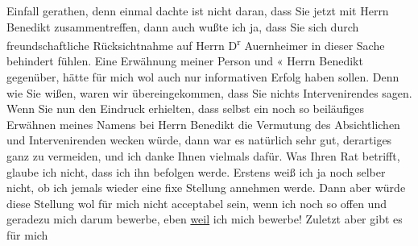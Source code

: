 \begin{ledgroupsized}[t]{13cm}
               Einfall gerathen, denn einmal dachte ist nicht daran, dass Sie jetzt mit Herrn Benedikt zusammentreffen, dann auch wußte ich
               ja, dass Sie sich durch freundschaftliche Rücksichtnahme auf Herrn D\textsuperscript{r}{ }Auernheimer in dieser Sache behindert fühlen. Eine Erwähnung meiner
               Person und \label{K_L03553-3v}\label{K_L03553-3h}« Herrn
                  Benedikt gegenüber, hätte für mich wol auch
               nur informativen Erfolg haben sollen. Denn wie Sie wißen, waren wir übereingekommen,
               dass Sie nichts Intervenirendes sagen. Wenn Sie nun den Eindruck erhielten, dass
               selbst ein noch so beiläufiges Erwähnen meines Namens bei Herrn Benedikt die Vermutung des Absichtlichen und Intervenirenden
               wecken würde, dann war es natürlich sehr gut, derartiges ganz zu vermeiden, und ich
               danke Ihnen vielmals dafür. Was Ihren Rat betrifft, glaube ich nicht, dass ich ihn
               befolgen werde. Erstens weiß ich ja noch selber nicht, ob ich jemals wieder eine fixe
                  {\pb}Stellung annehmen werde.
               Dann aber würde diese Stellung wol für mich nicht acceptabel sein, wenn ich noch so
               offen und geradezu mich darum bewerbe, {\dotstwo} eben \uline{weil} ich mich bewerbe! Zuletzt aber gibt es für mich

\end{ledgroupsized}
